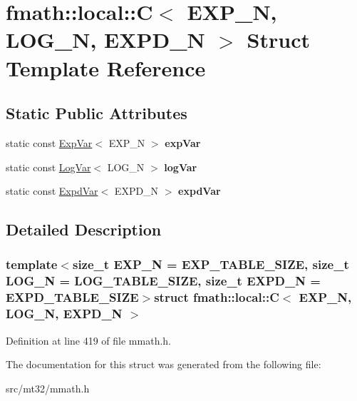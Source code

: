 \hypertarget{structfmath_1_1local_1_1C}{\section{fmath\-:\-:local\-:\-:C$<$ E\-X\-P\-\_\-\-N, L\-O\-G\-\_\-\-N, E\-X\-P\-D\-\_\-\-N $>$ Struct Template Reference}
\label{structfmath_1_1local_1_1C}
}
\subsection*{Static Public Attributes}
\begin{DoxyCompactItemize}
\item 
\hypertarget{structfmath_1_1local_1_1C_ad9a9c8958d9238f7185120e897cffd7e}{static const \hyperlink{structfmath_1_1local_1_1ExpVar}{Exp\-Var}$<$ E\-X\-P\-\_\-\-N $>$ {\bfseries exp\-Var}}\label{structfmath_1_1local_1_1C_ad9a9c8958d9238f7185120e897cffd7e}

\item 
\hypertarget{structfmath_1_1local_1_1C_a6ed90bdf46a6283346b0759638e37e79}{static const \hyperlink{structfmath_1_1local_1_1LogVar}{Log\-Var}$<$ L\-O\-G\-\_\-\-N $>$ {\bfseries log\-Var}}\label{structfmath_1_1local_1_1C_a6ed90bdf46a6283346b0759638e37e79}

\item 
\hypertarget{structfmath_1_1local_1_1C_a12cfecf7377b29bb5e9d11eb9d1cd974}{static const \hyperlink{structfmath_1_1local_1_1ExpdVar}{Expd\-Var}$<$ E\-X\-P\-D\-\_\-\-N $>$ {\bfseries expd\-Var}}\label{structfmath_1_1local_1_1C_a12cfecf7377b29bb5e9d11eb9d1cd974}

\end{DoxyCompactItemize}


\subsection{Detailed Description}
\subsubsection*{template$<$size\-\_\-t E\-X\-P\-\_\-\-N = E\-X\-P\-\_\-\-T\-A\-B\-L\-E\-\_\-\-S\-I\-Z\-E, size\-\_\-t L\-O\-G\-\_\-\-N = L\-O\-G\-\_\-\-T\-A\-B\-L\-E\-\_\-\-S\-I\-Z\-E, size\-\_\-t E\-X\-P\-D\-\_\-\-N = E\-X\-P\-D\-\_\-\-T\-A\-B\-L\-E\-\_\-\-S\-I\-Z\-E$>$struct fmath\-::local\-::\-C$<$ E\-X\-P\-\_\-\-N, L\-O\-G\-\_\-\-N, E\-X\-P\-D\-\_\-\-N $>$}



Definition at line 419 of file mmath.\-h.



The documentation for this struct was generated from the following file\-:\begin{DoxyCompactItemize}
\item 
src/mt32/mmath.\-h\end{DoxyCompactItemize}
